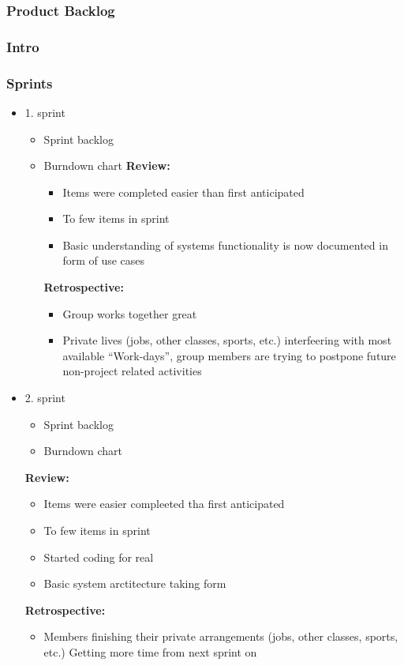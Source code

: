 \documentclass[11pt]{article}
\begin{document}
\begin{itemize}
\end{itemize} %
\subsubsection{Product Backlog}
\label{sec-5-1-2}
\subsubsection{Intro}
\label{sec-5-1-3}
\subsubsection{Sprints}
\label{sec-5-1-4}
\begin{itemize}

\item 1. sprint
\label{sec-5-1-4-1}%
\begin{itemize}
\item Sprint backlog
\item Burndown chart
       \textbf{Review:}
\begin{itemize}
\item Items were completed easier than first anticipated
\item To few items in sprint
\item Basic understanding of systems functionality is now documented in form of use cases
\end{itemize}
\textbf{Retrospective:}
\begin{itemize}
\item Group works together great
\item Private lives (jobs, other classes, sports, etc.) interfeering with most available
         ``Work-days'', group members are trying to postpone future non-project related activities
\end{itemize}
\end{itemize}

\item 2. sprint
\label{sec-5-1-4-2}%
\begin{itemize}
\item Sprint backlog
\item Burndown chart
\end{itemize}
     \textbf{Review:}
\begin{itemize}
\item Items were easier compleeted tha first anticipated
\item To few items in sprint
\item Started coding for real
\item Basic system arctitecture taking form
\end{itemize}
     \textbf{Retrospective:}
\begin{itemize}
\item Members finishing their private arrangements (jobs, other classes, sports, etc.)
       Getting more time from next sprint on
\end{itemize}


\end{itemize}
\end{document}

